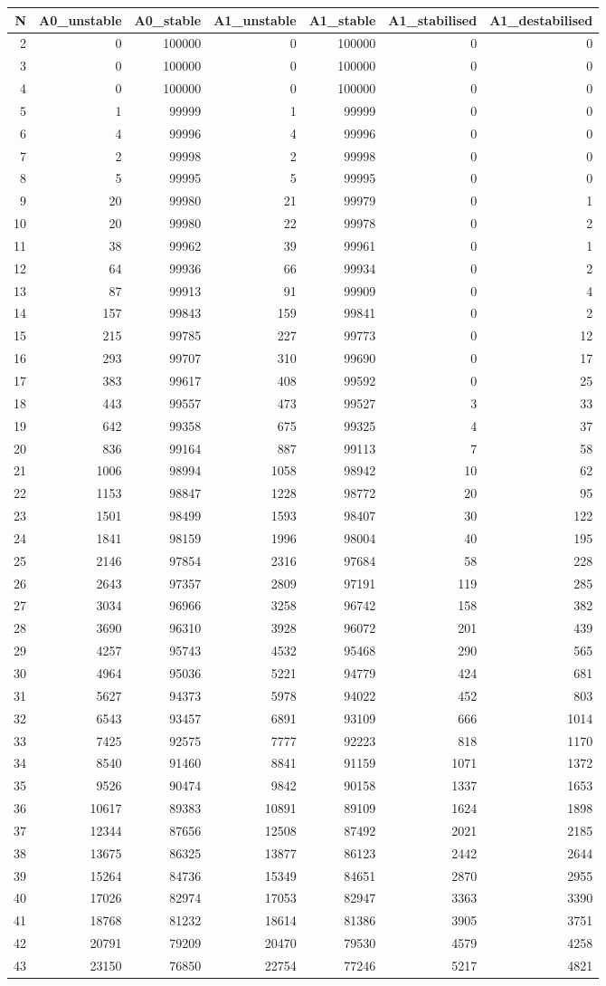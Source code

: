 \documentclass[]{article}
\begin{document}
\begin{longtable}[]{@{}rrrrrrr@{}}
\toprule
N & A0\_unstable & A0\_stable & A1\_unstable & A1\_stable &
A1\_stabilised & A1\_destabilised\tabularnewline
\midrule
\endhead
2 & 0 & 100000 & 0 & 100000 & 0 & 0\tabularnewline
3 & 0 & 100000 & 0 & 100000 & 0 & 0\tabularnewline
4 & 0 & 100000 & 0 & 100000 & 0 & 0\tabularnewline
5 & 1 & 99999 & 1 & 99999 & 0 & 0\tabularnewline
6 & 4 & 99996 & 4 & 99996 & 0 & 0\tabularnewline
7 & 2 & 99998 & 2 & 99998 & 0 & 0\tabularnewline
8 & 5 & 99995 & 5 & 99995 & 0 & 0\tabularnewline
9 & 20 & 99980 & 21 & 99979 & 0 & 1\tabularnewline
10 & 20 & 99980 & 22 & 99978 & 0 & 2\tabularnewline
11 & 38 & 99962 & 39 & 99961 & 0 & 1\tabularnewline
12 & 64 & 99936 & 66 & 99934 & 0 & 2\tabularnewline
13 & 87 & 99913 & 91 & 99909 & 0 & 4\tabularnewline
14 & 157 & 99843 & 159 & 99841 & 0 & 2\tabularnewline
15 & 215 & 99785 & 227 & 99773 & 0 & 12\tabularnewline
16 & 293 & 99707 & 310 & 99690 & 0 & 17\tabularnewline
17 & 383 & 99617 & 408 & 99592 & 0 & 25\tabularnewline
18 & 443 & 99557 & 473 & 99527 & 3 & 33\tabularnewline
19 & 642 & 99358 & 675 & 99325 & 4 & 37\tabularnewline
20 & 836 & 99164 & 887 & 99113 & 7 & 58\tabularnewline
21 & 1006 & 98994 & 1058 & 98942 & 10 & 62\tabularnewline
22 & 1153 & 98847 & 1228 & 98772 & 20 & 95\tabularnewline
23 & 1501 & 98499 & 1593 & 98407 & 30 & 122\tabularnewline
24 & 1841 & 98159 & 1996 & 98004 & 40 & 195\tabularnewline
25 & 2146 & 97854 & 2316 & 97684 & 58 & 228\tabularnewline
26 & 2643 & 97357 & 2809 & 97191 & 119 & 285\tabularnewline
27 & 3034 & 96966 & 3258 & 96742 & 158 & 382\tabularnewline
28 & 3690 & 96310 & 3928 & 96072 & 201 & 439\tabularnewline
29 & 4257 & 95743 & 4532 & 95468 & 290 & 565\tabularnewline
30 & 4964 & 95036 & 5221 & 94779 & 424 & 681\tabularnewline
31 & 5627 & 94373 & 5978 & 94022 & 452 & 803\tabularnewline
32 & 6543 & 93457 & 6891 & 93109 & 666 & 1014\tabularnewline
33 & 7425 & 92575 & 7777 & 92223 & 818 & 1170\tabularnewline
34 & 8540 & 91460 & 8841 & 91159 & 1071 & 1372\tabularnewline
35 & 9526 & 90474 & 9842 & 90158 & 1337 & 1653\tabularnewline
36 & 10617 & 89383 & 10891 & 89109 & 1624 & 1898\tabularnewline
37 & 12344 & 87656 & 12508 & 87492 & 2021 & 2185\tabularnewline
38 & 13675 & 86325 & 13877 & 86123 & 2442 & 2644\tabularnewline
39 & 15264 & 84736 & 15349 & 84651 & 2870 & 2955\tabularnewline
40 & 17026 & 82974 & 17053 & 82947 & 3363 & 3390\tabularnewline
41 & 18768 & 81232 & 18614 & 81386 & 3905 & 3751\tabularnewline
42 & 20791 & 79209 & 20470 & 79530 & 4579 & 4258\tabularnewline
43 & 23150 & 76850 & 22754 & 77246 & 5217 & 4821\tabularnewline

\end{longtable}
\end{document}
